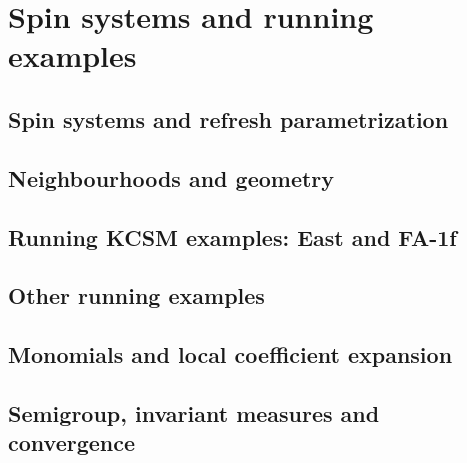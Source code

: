 \section{Spin systems and running examples}
\label{sec:setup}

\subsection{Spin systems and refresh parametrization}

\subsection{Neighbourhoods and geometry}

\subsection{Running KCSM examples: East and FA-1f}

\subsection{Other running examples}

\subsection{Monomials and local coefficient expansion}

\subsection{Semigroup, invariant measures and convergence}
